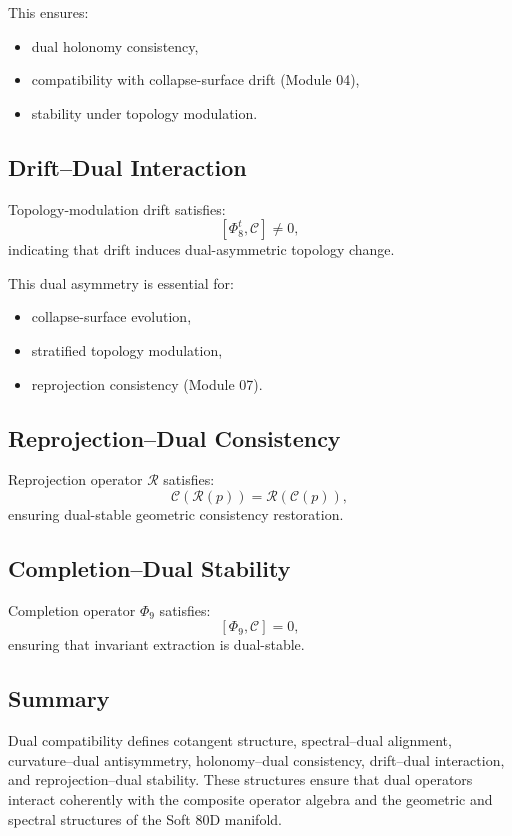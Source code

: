 This ensures:
\begin{itemize}
    \item dual holonomy consistency,
    \item compatibility with collapse-surface drift (Module 04),
    \item stability under topology modulation.
\end{itemize}

\subsection{Drift–Dual Interaction}
Topology-modulation drift satisfies:
\[
[\Phi_8^t, \mathcal{C}] \neq 0,
\]
indicating that drift induces dual-asymmetric topology change.

This dual asymmetry is essential for:
\begin{itemize}
    \item collapse-surface evolution,
    \item stratified topology modulation,
    \item reprojection consistency (Module 07).
\end{itemize}

\subsection{Reprojection–Dual Consistency}
Reprojection operator $\mathcal{R}$ satisfies:
\[
\mathcal{C}(\mathcal{R}(p)) = \mathcal{R}(\mathcal{C}(p)),
\]
ensuring dual-stable geometric consistency restoration.

\subsection{Completion–Dual Stability}
Completion operator $\Phi_9$ satisfies:
\[
[\Phi_9, \mathcal{C}] = 0,
\]
ensuring that invariant extraction is dual-stable.

\subsection{Summary}
Dual compatibility defines cotangent structure, spectral–dual alignment,
curvature–dual antisymmetry, holonomy–dual consistency, drift–dual interaction,
and reprojection–dual stability. These structures ensure that dual operators
interact coherently with the composite operator algebra and the geometric and
spectral structures of the Soft 80D manifold.

